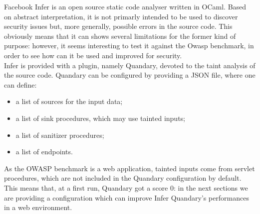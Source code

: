 \documentclass[../Report.tex]{subfiles}
\begin{document}
Facebook Infer is an open source static code analyser written in OCaml. Based on abstract interpretation, it is not primarly intended to be used to discover security issues but, more generally, possible errors in the source code. This obviously means that it can shows several limitations for the former kind of purpose: however, it seems interesting to test it against the Owasp benchmark, in order to see how can it be used and improved for security. \\
Infer is provided with a plugin, namely Quandary, devoted to the taint analysis of the source code. Quandary can be configured by providing a JSON file, where one can define:
\begin{itemize}
	\item a list of sources for the input data;
	\item a list of sink procedures, which may use tainted inputs;
	\item a list of sanitizer procedures;
	\item a list of endpoints.
\end{itemize}
As the OWASP benchmark is a web application, tainted inputs come from servlet procedures, which are not included in the Quandary configuration by default. This means that, at a first run, Quandary got a score 0: in the next sections we are providing a configuration which can improve Infer Quandary's performances in a web environment.
\end{document}
